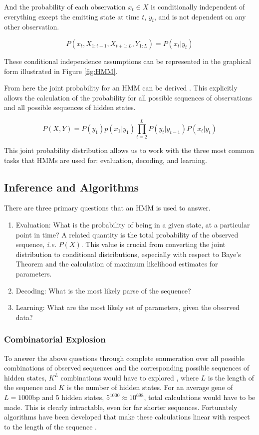 And the probability of each observation $x_t \in X$ is conditionally independent of everything except the emitting state at time $t$, $y_t$, and is not dependent on any other observation.

\begin{equation}
    P(x_t,X_{1:t-1},X_{t+1:L},Y_{1:L}) = P(x_t|y_t)
\end{equation}

These conditional independence assumptions can be represented in the graphical form illustrated in Figure \ref{fig:HMM}. 

From here the joint probability for an HMM can be derived \cite{Rabiner1989ARecognition}. This explicitly allows the calculation of the probability for all possible sequences of observations and all possible sequences of hidden states. 

\begin{equation}
    P(X,Y) = P(y_1)p(x_1|y_1)\prod_{t=2}^L{P(y_t|y_{t-1})P(x_t|y_t)}
\label{eq:jointhmm}
\end{equation}

This joint probability distribution allows us to work with the three most common tasks that HMMs are used for: evaluation, decoding, and learning.
\subsection{Inference and Algorithms}
There are three primary questions that an HMM is used to answer. 

\begin{enumerate}
    \item Evaluation: What is the probability of being in a given state, at a particular point in time? A related quantity is the total probability of the observed sequence, \emph{i.e.} $P(X)$. This value is crucial from converting the joint distribution to conditional distributions, especially with respect to Baye's Theorem and the calculation of maximum likelihood estimates for parameters.
    \item Decoding: What is the most likely parse of the sequence? 
    \item Learning: What are the most likely set of parameters, given the observed data?
\end{enumerate}

\subsubsection{Combinatorial Explosion}
To answer the above questions through complete enumeration over all possible combinations of observed sequences and the corresponding possible sequences of hidden states, $K^L$ combinations would have to explored \cite{Rabiner1989ARecognition}, where $L$ is the length of the sequence and $K$ is the number of hidden states. For an average gene of $L=1000$bp and 5 hidden states, $5^{1000}\approx10^{698}$, total calculations would have to be made. This is clearly intractable, even for far shorter sequences. Fortunately algorithms have been developed that make these calculations linear with respect to the length of the sequence \cite{Rabiner1989ARecognition}. 

